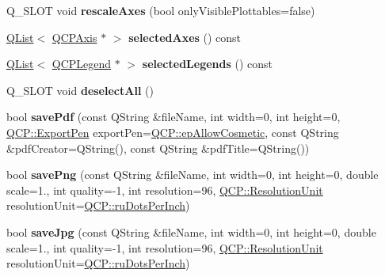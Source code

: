 \begin{DoxyCompactItemize}
Q\+\_\+\+S\+L\+OT void {\bfseries rescale\+Axes} (bool only\+Visible\+Plottables=false)
\item 
\mbox{\label{class_q_custom_plot_a1af73054e59daf2f820b140064947b2e}} 
\hyperlink{class_q_list}{Q\+List}$<$ \hyperlink{class_q_c_p_axis}{Q\+C\+P\+Axis} $\ast$ $>$ {\bfseries selected\+Axes} () const
\item 
\mbox{\label{class_q_custom_plot_a23eb163020ad11b94b0af63ce98b93e0}} 
\hyperlink{class_q_list}{Q\+List}$<$ \hyperlink{class_q_c_p_legend}{Q\+C\+P\+Legend} $\ast$ $>$ {\bfseries selected\+Legends} () const
\item 
\mbox{\label{class_q_custom_plot_a3b2698464e81b0771bdcaeb5bd306886}} 
Q\+\_\+\+S\+L\+OT void {\bfseries deselect\+All} ()
\item 
\mbox{\label{class_q_custom_plot_ad5acd34f6b39c3516887d7e54fec2412}} 
bool {\bfseries save\+Pdf} (const Q\+String \&file\+Name, int width=0, int height=0, \hyperlink{namespace_q_c_p_a17844f19e1019693a953e1eb93536d2f}{Q\+C\+P\+::\+Export\+Pen} export\+Pen=\hyperlink{namespace_q_c_p_a17844f19e1019693a953e1eb93536d2fa34716c7388ad3a2ff3ac27e57fb83a5b}{Q\+C\+P\+::ep\+Allow\+Cosmetic}, const Q\+String \&pdf\+Creator=Q\+String(), const Q\+String \&pdf\+Title=Q\+String())
\item 
\mbox{\label{class_q_custom_plot_ac92cc9256d12f354b40a4be4600b5fb9}} 
bool {\bfseries save\+Png} (const Q\+String \&file\+Name, int width=0, int height=0, double scale=1., int quality=-\/1, int resolution=96, \hyperlink{namespace_q_c_p_a715d46153da230990aa887d0f0602452}{Q\+C\+P\+::\+Resolution\+Unit} resolution\+Unit=\hyperlink{namespace_q_c_p_a715d46153da230990aa887d0f0602452a9def6fd83de9b4108ad999541a42ac6a}{Q\+C\+P\+::ru\+Dots\+Per\+Inch})
\item 
\mbox{\label{class_q_custom_plot_a76f0d278e630a711fa6f48048cfd83e4}} 
bool {\bfseries save\+Jpg} (const Q\+String \&file\+Name, int width=0, int height=0, double scale=1., int quality=-\/1, int resolution=96, \hyperlink{namespace_q_c_p_a715d46153da230990aa887d0f0602452}{Q\+C\+P\+::\+Resolution\+Unit} resolution\+Unit=\hyperlink{namespace_q_c_p_a715d46153da230990aa887d0f0602452a9def6fd83de9b4108ad999541a42ac6a}{Q\+C\+P\+::ru\+Dots\+Per\+Inch})

\end{DoxyCompactItemize}
